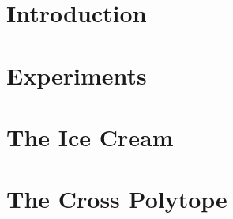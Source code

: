 \documentclass{report}
\begin{document}
%

\newpage

\tableofcontents

\chapter{Introduction}



\chapter{Experiments}



\appendix
\chapter{The Ice Cream} \label{app_ice_cream}



\chapter{The Cross Polytope} \label{app_cross_polytope}


\end{document}
